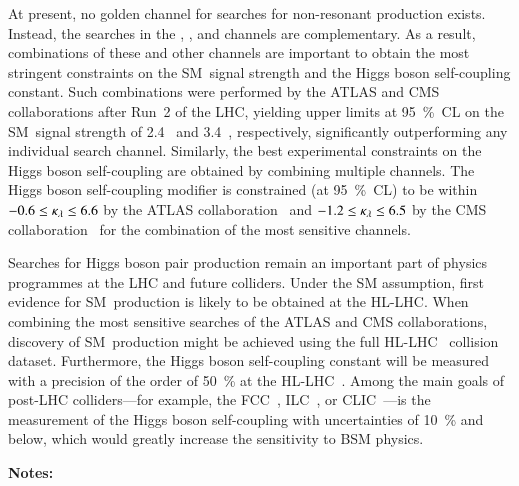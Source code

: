 At present, no golden channel for searches for non-resonant \HH production
exists. Instead, the searches in the \bbbb, \bbtautau, and \bbyy channels are
complementary. As a result, combinations of these and other channels are
important to obtain the most stringent constraints on the SM~\HH signal strength
and the Higgs boson self-coupling constant. Such combinations were performed by
the ATLAS and CMS collaborations after Run~2 of the LHC, yielding upper limits
at \SI{95}{\percent}~CL on the SM~\HH signal strength of 2.4~\cite{HDBS-2022-03}
and 3.4~\cite{CMS-HIG-22-001}, respectively, significantly outperforming any
individual search channel. Similarly, the best experimental constraints on the
Higgs boson self-coupling are obtained by combining multiple channels. The Higgs
boson self-coupling modifier is constrained (at \SI{95}{\percent}~CL) to be
within $-0.6 \leq \kappa_{\lambda} \leq 6.6$ by the ATLAS
collaboration~\cite{HDBS-2022-03} and $-1.2 \leq \kappa_{\lambda} \leq 6.5$ by the CMS
collaboration~\cite{CMS-HIG-22-001} for the combination of the most sensitive
channels.


Searches for Higgs boson pair production remain an important part of physics
programmes at the LHC and future colliders. Under the SM assumption, first
evidence for SM~\HH production is likely to be obtained at the HL-LHC. When
combining the most sensitive searches of the ATLAS and CMS collaborations,
discovery of SM~\HH production might be achieved using the full HL-LHC
\pp~collision dataset. Furthermore, the Higgs boson self-coupling constant will
be measured with a precision of the order of \SI{50}{\percent} at the
HL-LHC~\cite{DiMicco:2019ngk}. Among the main goals of post-LHC colliders---for
example, the FCC~\cite{FCC:2018byv}, ILC~\cite{Bambade:2019fyw}, or
CLIC~\cite{CLIC:2018fvx}---is the measurement of the Higgs boson self-coupling
with uncertainties of \SI{10}{\percent} and below, which would greatly increase
the sensitivity to BSM physics.


\newpage\noindent\textbf{Notes:}\\


